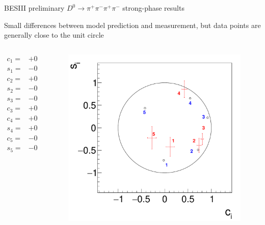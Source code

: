 \documentclass[xcolor={dvipsnames}]{beamer}
\begin{document}
\begin{frame}{BESIII preliminary $D^0\to\pi^+\pi^-\pi^+\pi^-$ strong-phase results}
  \begin{center}
    Small differences between model prediction and measurement, but data points are generally close to the unit circle
  \end{center}
  \vspace{-0.3cm}
  \begin{columns}
    \begin{column}{0.50\textwidth}
      \vspace{-0.5cm}
      \begin{align*}
        c_1 =& +0.12 \pm 0.09 \pm 0.02 \\
        s_1 =& -0.42 \pm 0.21 \pm 0.04 \\
        c_2 =& +0.74 \pm 0.04 \pm 0.02 \\
        s_2 =& -0.39 \pm 0.16 \pm 0.06 \\
        s_3 =& -0.25 \pm 0.12 \pm 0.03 \\
        c_3 =& +0.81 \pm 0.03 \pm 0.01 \\
        c_4 =& +0.42 \pm 0.06 \pm 0.02 \\
        s_4 =& +0.86 \pm 0.19 \pm 0.07 \\
        c_5 =& -0.27 \pm 0.09 \pm 0.03 \\
        s_5 =& -0.22 \pm 0.25 \pm 0.08
      \end{align*}
    \end{column}
    \begin{column}{0.50\textwidth}
      \begin{figure}
        \centering
        \includegraphics[width=1.0\textwidth]{Plots/CiSiOptim.pdf}

\end{figure}
\end{column}
\end{columns}
\end{frame}
\end{document}
